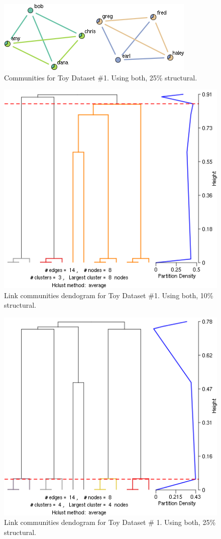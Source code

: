 \documentclass{report} %
\begin{document}



\begin{figure}[htp!]
  \centering
  \includegraphics[width=0.5\linewidth]{toy2/ea/edge_comm_0.25.png}
  \caption{Communities for Toy Dataset \#1. Using both, 25\% structural.}
\end{figure}

\begin{figure}[htp!]
  \centering
  \includegraphics[width=0.6\linewidth]{toy2/ea/lc_0.1.png}
  \caption{Link communities dendogram for Toy Dataset \#1. Using both, 10\% structural.}
\end{figure}

\begin{figure}[htp!]
  \centering
  \includegraphics[width=0.6\linewidth]{toy2/ea/lc_0.25.png}
  \caption{Link communities dendogram for Toy Dataset \# 1. Using both, 25\% structural.}
\end{figure}
\end{document}
